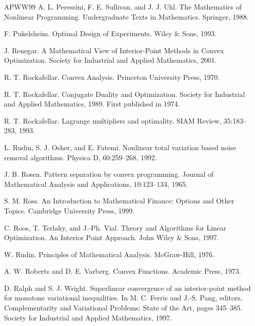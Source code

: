 \begin{thebibliography}{APWW99}
 A. L. Peressini, F. E. Sullivan, and J. J. Uhl. The Mathematics of Nonlinear Programming. Undergraduate Texts in Mathematics. Springer, 1988.

 F. Pukelsheim. Optimal Design of Experiments. Wiley \& Sons, 1993.

 J. Renegar. A Mathematical View of Interior-Point Methods in Convex Optimization. Society for Industrial and Applied Mathematics, 2001.

 R. T. Rockafellar. Convex Analysis. Princeton University Press, 1970.

 R. T. Rockafellar. Conjugate Duality and Optimization. Society for Industrial and Applied Mathematics, 1989. First published in 1974.

 R. T. Rockafellar. Lagrange multipliers and optimality. SIAM Review, 35:183–283, 1993.

 L. Rudin, S. J. Osher, and E. Fatemi. Nonlinear total variation based noise removal algorithms. Physica D, 60:259–268, 1992.

 J. B. Rosen. Pattern separation by convex programming. Journal of Mathematical Analysis and Applications, 10:123–134, 1965.

 S. M. Ross. An Introduction to Mathematical Finance: Options and Other Topics. Cambridge University Press, 1999.

 C. Roos, T. Terlaky, and J.-Ph. Vial. Theory and Algorithms for Linear Optimization. An Interior Point Approach. John Wiley \& Sons, 1997.

 W. Rudin. Principles of Mathematical Analysis. McGraw-Hill, 1976.

 A. W. Roberts and D. E. Varberg. Convex Functions. Academic Press, 1973.

 D. Ralph and S. J. Wright. Superlinear convergence of an interior-point method for monotone variational inequalities. In M. C. Ferris and J.-S. Pang, editors, Complementarity and Variational Problems: State of the Art, pages 345–385. Society for Industrial and Applied Mathematics, 1997.


\end{thebibliography}
